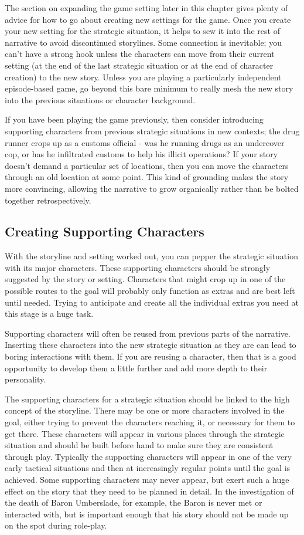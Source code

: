 \documentclass[twoside]{book}
\begin{document}
The section on expanding the game setting later in this chapter gives
plenty of advice for how to go about creating new settings for the
game. Once you create your new setting for the strategic situation, it
helps to sew it into the rest of narrative to avoid discontinued
storylines. Some connection is inevitable; you can't have a strong
hook unless the characters can move from their current setting (at the
end of the last strategic situation or at the end of character
creation) to the new story. Unless you are playing a particularly
independent episode-based game, go beyond this bare minimum to really
mesh the new story into the previous situations or character
background.

If you have been playing the game previously, then consider
introducing supporting characters from previous strategic situations
in new contexts; the drug runner crops up as a customs official - was
he running drugs as an undercover cop, or has he infiltrated customs
to help his illicit operations? If your story doesn't demand a
particular set of locations, then you can move the characters through
an old location at some point. This kind of grounding makes the story
more convincing, allowing the narrative to grow organically rather
than be bolted together retrospectively.

\subsection{Creating Supporting Characters}

With the storyline and setting worked out, you can pepper the
strategic situation with its major characters. These supporting
characters should be strongly suggested by the story or
setting. Characters that might crop up in one of the possible routes
to the goal will probably only function as extras and are best left
until needed. Trying to anticipate and create all the individual
extras you need at this stage is a huge task.

Supporting characters will often be reused from previous parts of the
narrative. Inserting these characters into the new strategic situation
as they are can lead to boring interactions with them. If you are
reusing a character, then that is a good opportunity to develop them a
little further and add more depth to their personality.

The supporting characters for a strategic situation should be linked
to the high concept of the storyline. There may be one or more
characters involved in the goal, either trying to prevent the
characters reaching it, or necessary for them to get there. These
characters will appear in various places through the strategic
situation and should be built before hand to make sure they are
consistent through play. Typically the supporting characters will
appear in one of the very early tactical situations and then at
increasingly regular points until the goal is achieved. Some
supporting characters may never appear, but exert such a huge effect
on the story that they need to be planned in detail. In the
investigation of the death of Baron Umberslade, for example, the Baron
is never met or interacted with, but is important enough that his
story should not be made up on the spot during role-play.
\end{document}
